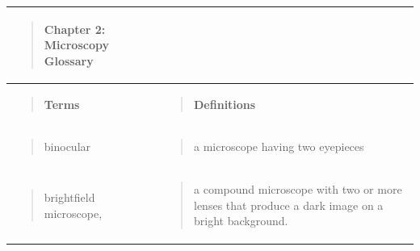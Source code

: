 \documentclass[
  letterpaper,
  DIV=11,
  numbers=noendperiod]{scrreprt}
\newcounter{none} %
\begin{document}
{\def\LTcaptype{none} %
\begin{longtable}[]{@{}
  >{\centering\arraybackslash}p{}
  >{\centering\arraybackslash}p{}@{}}
\toprule\noalign{}
\begin{minipage}[b]{\linewidth}\centering
\begin{quote}
\textbf{Chapter 2: Microscopy Glossary}
\end{quote}
\end{minipage} & \begin{minipage}[b]{\linewidth}\centering
\end{minipage} \\
\midrule\noalign{}
\endhead
\bottomrule\noalign{}
\endlastfoot
\begin{minipage}[t]{\linewidth}\centering
\begin{quote}
\textbf{Terms}
\end{quote}
\end{minipage} & \begin{minipage}[t]{\linewidth}\centering
\begin{quote}
\textbf{Definitions}
\end{quote}
\end{minipage} \\
\begin{minipage}[t]{\linewidth}\centering
\begin{quote}
binocular
\end{quote}
\end{minipage} & \begin{minipage}[t]{\linewidth}\centering
\begin{quote}
a microscope having two eyepieces
\end{quote}
\end{minipage} \\
\begin{minipage}[t]{\linewidth}\centering
\begin{quote}
brightfield microscope,
\end{quote}
\end{minipage} & \begin{minipage}[t]{\linewidth}\centering
\begin{quote}
a compound microscope with two or more lenses that produce a dark image
on a bright background.
\end{quote}
\end{minipage} \\

\end{longtable}}
\end{document}
